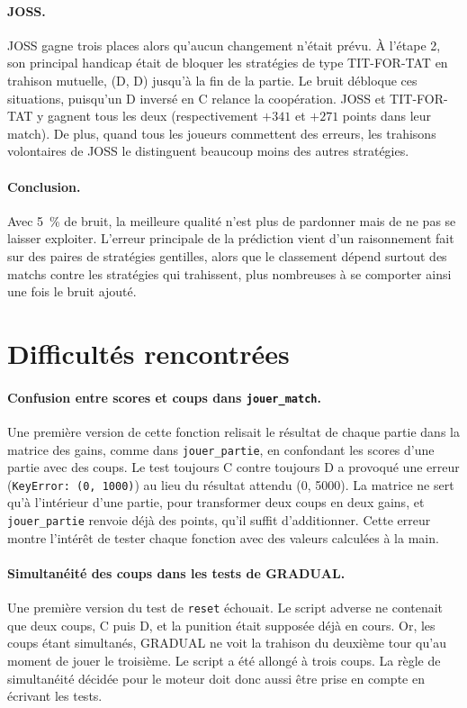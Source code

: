 \documentclass[11pt,a4paper]{article}
\begin{document}
\paragraph{JOSS.} JOSS gagne trois places alors qu'aucun changement n'était prévu. À l'étape 2, son principal handicap était
de bloquer les stratégies de type TIT-FOR-TAT en trahison mutuelle, (D, D) jusqu'à la fin de la partie. Le bruit débloque ces
situations, puisqu'un D inversé en C relance la coopération. JOSS et TIT-FOR-TAT y gagnent tous les deux (respectivement
$+341$ et $+271$ points dans leur match). De plus, quand tous les joueurs commettent des erreurs, les trahisons volontaires de
JOSS le distinguent beaucoup moins des autres stratégies.

\paragraph{Conclusion.} Avec 5~\% de bruit, la meilleure qualité n'est plus de pardonner mais de ne pas se laisser exploiter.
L'erreur principale de la prédiction vient d'un raisonnement fait sur des paires de stratégies gentilles, alors que le
classement dépend surtout des matchs contre les stratégies qui trahissent, plus nombreuses à se comporter ainsi une fois le
bruit ajouté.

\section{Difficultés rencontrées}
\paragraph{Confusion entre scores et coups dans \texttt{jouer\_match}.} Une première version de cette fonction relisait le
résultat de chaque partie dans la matrice des gains, comme dans \texttt{jouer\_partie}, en confondant les scores d'une partie
avec des coups. Le test \og toujours C contre toujours D \fg{} a provoqué une erreur (\texttt{KeyError: (0, 1000)}) au lieu du
résultat attendu (0, 5000). La matrice ne sert qu'à l'intérieur d'une partie, pour transformer deux coups en deux gains, et
\texttt{jouer\_partie} renvoie déjà des points, qu'il suffit d'additionner. Cette erreur montre l'intérêt de tester chaque
fonction avec des valeurs calculées à la main.

\paragraph{Simultanéité des coups dans les tests de GRADUAL.} Une première version du test de \texttt{reset} échouait. Le
script adverse ne contenait que deux coups, C puis D, et la punition était supposée déjà en cours. Or, les coups étant
simultanés, GRADUAL ne voit la trahison du deuxième tour qu'au moment de jouer le troisième. Le script a été allongé à trois
coups. La règle de simultanéité décidée pour le moteur doit donc aussi être prise en compte en écrivant les tests.
\end{document}
